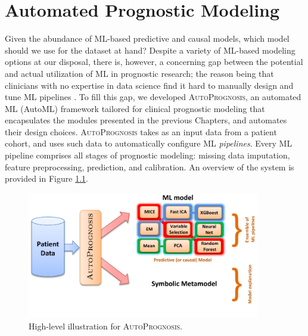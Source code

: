 \documentclass [PhD] {uclathes}
\begin{document}
\chapter{Automated Prognostic Modeling}
Given the abundance of ML-based predictive and causal models, which model should we use for the dataset at hand? Despite a variety of ML-based modeling options at our disposal, there is, however, a concerning gap between the potential and actual utilization of ML in prognostic research; the reason being that clinicians with no expertise in data science find it hard to manually design and tune ML pipelines \cite{luo2017automating}. To fill this gap, we developed {\footnotesize \textsc{AutoPrognosis}}, an automated ML (AutoML) framework tailored for clinical prognostic modeling that encapsulates the modules presented in the previous Chapters, and automates their design choices. {\footnotesize \textsc{AutoPrognosis}} takes as an input data from a patient cohort, and uses such data to automatically configure ML {\it pipelines}. Every ML pipeline comprises all stages of prognostic modeling: missing data imputation, feature preprocessing, prediction, and calibration. An overview of the system is provided in Figure \ref{ch4fig1}. 

\begin{figure}[h]
\centering
\includegraphics[width=4in]{ch4Fig1.pdf}
\caption{High-level illustration for \textsc{AutoPrognosis}.}
\label{ch4fig1} 
\end{figure}
\end{document}
